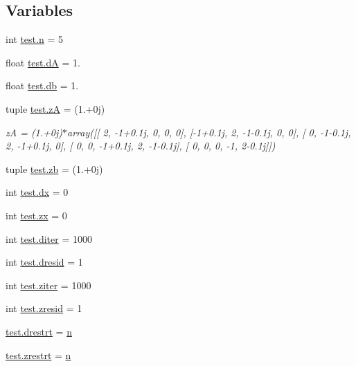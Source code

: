 \subsection*{Variables}
\begin{DoxyCompactItemize}
\item 
int \hyperlink{namespacetest_a9893fd1b53974b0a3c134bd2e50163e6}{test.\+n} = 5
\item 
float \hyperlink{namespacetest_a0e3e0685c3885bbd9996e8c97c0718b5}{test.\+d\+A} = 1.
\item 
float \hyperlink{namespacetest_a64318c198632d695e0c61b50f9126284}{test.\+db} = 1.
\item 
tuple \hyperlink{namespacetest_a59b42baf65b733d63e04bf0b871e98cd}{test.\+z\+A} = (1.+0j)
\begin{DoxyCompactList}\small\item\em z\+A = (1.+0j)$\ast$array(\mbox{[}\mbox{[} 2, -\/1+0.1j, 0, 0, 0\mbox{]}, \mbox{[}-\/1+0.1j, 2, -\/1-\/0.\+1j, 0, 0\mbox{]}, \mbox{[} 0, -\/1-\/0.\+1j, 2, -\/1+0.1j, 0\mbox{]}, \mbox{[} 0, 0, -\/1+0.1j, 2, -\/1-\/0.\+1j\mbox{]}, \mbox{[} 0, 0, 0, -\/1, 2-\/0.\+1j\mbox{]}\mbox{]}) \end{DoxyCompactList}\item 
tuple \hyperlink{namespacetest_ae02a6e9ec4e5c8d8ec7f3421d3dc9e68}{test.\+zb} = (1.+0j)
\item 
int \hyperlink{namespacetest_a52d96848d24a2f8133653eb707eda14d}{test.\+dx} = 0
\item 
int \hyperlink{namespacetest_aefba49a27ed9d351b74e202e6c246fa5}{test.\+zx} = 0
\item 
int \hyperlink{namespacetest_a629e2d90d20378b99fc5e08c58a83f3b}{test.\+diter} = 1000
\item 
int \hyperlink{namespacetest_aceb99ee5693f47864fccd523dc3e9731}{test.\+dresid} = 1
\item 
int \hyperlink{namespacetest_ada01eb8317943098aafde6e4ad69bde7}{test.\+ziter} = 1000
\item 
int \hyperlink{namespacetest_ac1f674a9fd2532e0f01b06945f02e25c}{test.\+zresid} = 1
\item 
\hyperlink{namespacetest_adc1c3add90e70e3c946bd310792fd48a}{test.\+drestrt} = \hyperlink{indexexpr_8h_ab427e2e2b4d6cec55fa088ea2a692ace}{n}
\item 
\hyperlink{namespacetest_aecfe76bbc05b795146e283b4766d8051}{test.\+zrestrt} = \hyperlink{indexexpr_8h_ab427e2e2b4d6cec55fa088ea2a692ace}{n}
\end{DoxyCompactItemize}

